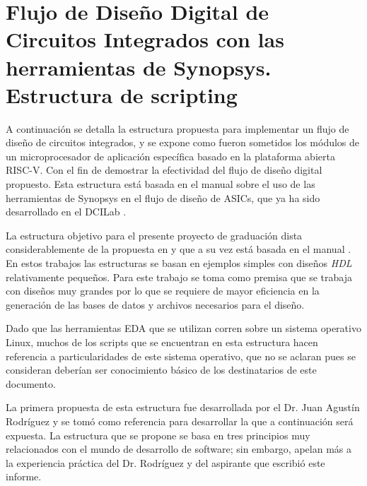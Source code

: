 \chapter{Flujo de Diseño Digital de Circuitos Integrados con las herramientas de Synopsys. Estructura de scripting}
\label{ch:scripting}

A continuación se detalla la estructura propuesta para implementar un flujo de diseño de circuitos integrados, y se expone como fueron sometidos los módulos de un microprocesador de aplicación específica basado en la plataforma abierta RISC-V. Con el fin de demostrar la efectividad del flujo de diseño digital propuesto. Esta estructura está basada en el manual sobre el uso de las herramientas de Synopsys en el flujo de diseño de ASICs, que ya ha sido desarrollado en el DCILab \cite{FlujoJairo2016}.

La estructura objetivo para el presente proyecto de graduación dista considerablemente de la propuesta en \cite{FlujoJairo2016} y que a su vez está basada en el manual \cite{kommuru2009asic}. En estos trabajos las estructuras se basan en ejemplos simples con diseños \textit{HDL} relativamente pequeños. Para este trabajo se toma como premisa que se trabaja con diseños muy grandes por lo que se requiere de mayor eficiencia en la generación de las bases de datos y archivos necesarios para el diseño.

Dado que las herramientas EDA que se utilizan corren sobre un sistema operativo Linux, muchos de los scripts que se encuentran en esta estructura hacen referencia a particularidades de este sistema operativo, que no se aclaran pues se consideran deberían ser conocimiento básico de los destinatarios de este documento.

La primera propuesta de esta estructura fue desarrollada por el Dr. Juan Agustín Rodríguez y se tomó como referencia para desarrollar la que a continuación será expuesta. La estructura que se propone se basa en tres principios muy relacionados con el mundo de desarrollo de software; sin embargo, apelan más a la experiencia práctica del Dr. Rodríguez y del aspirante que escribió este informe.


